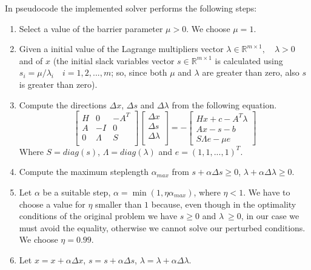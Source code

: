 \documentclass{article}
\begin{document}
In pseudocode the implemented solver performs the following steps:
%
\begin{enumerate}
\item Select a value of the barrier parameter $\mu > 0$. We choose $\mu = 1$. 

\item Given a initial value of the Lagrange multipliers vector $ \lambda \in \mathbb{R}^{m \times 1}, \quad \lambda > 0$ and of $x$ (the initial slack variables vector  $ s \in \mathbb{R}^{m \times 1}$ is calculated using $s_i=\mu/\lambda_i \quad i=1,2,...,m$; so, since both $\mu$ and $\lambda$ are greater than zero, also $s$ is greater than zero).

\item Compute the directions $\Delta x$, $\Delta s$ and $\Delta \lambda$ from the following equation.
%
\begin{equation*}
\begin{bmatrix}
H & 0 & -A^T \\
A & -I & 0 \\
0 & \Lambda & S \\
\end{bmatrix} 
\begin{bmatrix}
\Delta x \\
\Delta s \\
\Delta \lambda \\
\end{bmatrix} 
 = - 
\begin{bmatrix}
H x + c - A^T \lambda \\
A x - s - b \\
S \Lambda e - \mu e
\end{bmatrix} 
\end{equation*}
%
Where $S = diag(s)$, $\Lambda = diag(\lambda)$ and $e = (1, 1, ..., 1)^T$. 

\item Compute the maximum steplength $\alpha_{max}$ from $s + \alpha \Delta s \geq 0$, $\lambda + \alpha \Delta \lambda \geq 0$. 

\item Let $\alpha$ be a suitable step, $\alpha = \min{(1, \eta \alpha_{max})}$, where $\eta < 1$.  We have to choose a value for $\eta$ smaller than $1$ because, even though in the optimality conditions of the original problem we have $s\ge 0$ and $\lambda\ \ge 0$, in our case we must avoid the equality, otherwise we cannot solve our perturbed conditions. We choose $\eta = 0.99$.

\item Let $x = x + \alpha \Delta x$, $s = s + \alpha \Delta s$, $\lambda = \lambda + \alpha \Delta \lambda$.\\


\end{enumerate}
\end{document}
